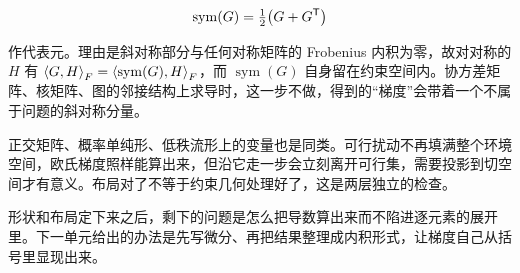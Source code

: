 \[
\operatorname{sym}(G)=\tfrac12\bigl(G+G^{\mathsf{T}}\bigr)
\]

作代表元。理由是斜对称部分与任何对称矩阵的 Frobenius 内积为零，故对对称的 \(H\) 有 \(\left\langle G,H\right\rangle_F=\left\langle\operatorname{sym}(G),H\right\rangle_F\)，而 \(\operatorname{sym}(G)\) 自身留在约束空间内。协方差矩阵、核矩阵、图的邻接结构上求导时，这一步不做，得到的``梯度''会带着一个不属于问题的斜对称分量。

正交矩阵、概率单纯形、低秩流形上的变量也是同类。可行扰动不再填满整个环境空间，欧氏梯度照样能算出来，但沿它走一步会立刻离开可行集，需要投影到切空间才有意义。布局对了不等于约束几何处理好了，这是两层独立的检查。

形状和布局定下来之后，剩下的问题是怎么把导数算出来而不陷进逐元素的展开里。下一单元给出的办法是先写微分、再把结果整理成内积形式，让梯度自己从括号里显现出来。
